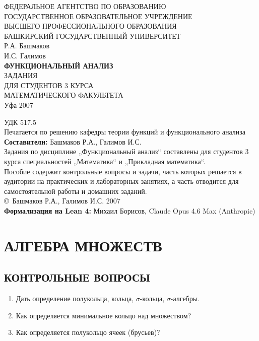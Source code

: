 \documentclass[12pt,a4paper]{article}
\begin{document}
\begin{titlepage}
  \centering
  ФЕДЕРАЛЬНОЕ АГЕНТСТВО ПО ОБРАЗОВАНИЮ\\[0.5cm]
  ГОСУДАРСТВЕННОЕ ОБРАЗОВАТЕЛЬНОЕ УЧРЕЖДЕНИЕ\\
  ВЫСШЕГО ПРОФЕССИОНАЛЬНОГО ОБРАЗОВАНИЯ\\
  БАШКИРСКИЙ ГОСУДАРСТВЕННЫЙ УНИВЕРСИТЕТ\\[3cm]

  Р.А. Башмаков\\
  И.С. Галимов\\[2cm]

  {\Large \bfseries ФУНКЦИОНАЛЬНЫЙ АНАЛИЗ}\\[1.5cm]

  {\large ЗАДАНИЯ\\
    ДЛЯ СТУДЕНТОВ 3 КУРСА\\
  МАТЕМАТИЧЕСКОГО ФАКУЛЬТЕТА}\\[4cm]

  \vfill
  Уфа 2007
\end{titlepage}

\newpage
\noindent УДК 517.5\\[0.5cm]
Печатается по решению кафедры теории функций и функционального анализа\\[0.5cm]
\textbf{Составители:} Башмаков Р.А., Галимов И.С.\\[0.5cm]
Задания по дисциплине „Функциональный анализ“ составлены для студентов 3 курса специальностей „Математика“ и „Прикладная математика“.\\[0.5cm]
Пособие содержит контрольные вопросы и задачи, часть которых решается в аудитории на практических и лабораторных занятиях, а часть отводится для самостоятельной работы и домашних заданий.\\[1cm]
\vfill
\noindent \copyright \ Башмаков Р.А., Галимов И.С. 2007\\[1cm]
\noindent \textbf{Формализация на Lean 4:} Михаил Борисов, Claude Opus 4.6 Max (Anthropic)

\newpage
\tableofcontents
\newpage

\section{АЛГЕБРА МНОЖЕСТВ}

\subsection*{КОНТРОЛЬНЫЕ ВОПРОСЫ}
\begin{enumerate}
  \item Дать определение полукольца, кольца, $\sigma$-кольца, $\sigma$-алгебры.
  \item Как определяется минимальное кольцо над множеством?
  \item Как определяется полукольцо ячеек (брусьев)?
\end{enumerate}
\end{document}
